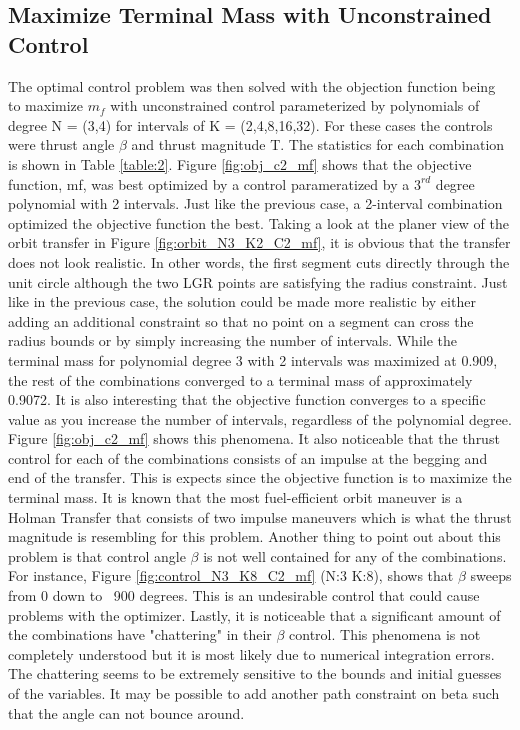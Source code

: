 \documentclass[]{article}
\begin{document}
	\subsection{Maximize Terminal Mass with Unconstrained Control}
	 The optimal control problem was then solved with the objection function being to maximize \(m_f\) with unconstrained control parameterized by polynomials of degree N = (3,4) for intervals of K = (2,4,8,16,32). For these cases the controls were thrust angle \(\beta\) and thrust magnitude T. The statistics for each combination is shown in Table \ref{table:2}. Figure \ref{fig:obj_c2_mf} shows that the objective function, mf, was best optimized by a control parameratized by a \(3^{rd}\) degree polynomial with 2 intervals. Just like the previous case, a 2-interval combination optimized the objective function the best. Taking a look at the planer view of the orbit transfer in Figure \ref{fig:orbit_N3_K2_C2_mf}, it is obvious that the transfer does not look realistic. In other words, the first segment cuts directly through the unit circle although the two LGR points are satisfying the radius constraint. Just like in the previous case, the solution could be made more realistic by either adding an additional constraint so that no point on a segment can cross the radius bounds or by simply increasing the number of intervals. While the terminal mass for polynomial degree 3 with 2 intervals was maximized at 0.909, the rest of the combinations converged to a terminal mass of approximately 0.9072. It is also interesting that the objective function converges to a specific value as you increase the number of intervals, regardless of the polynomial degree. Figure \ref{fig:obj_c2_mf} shows this phenomena. It also noticeable that the thrust control for each of the combinations consists of an impulse at the begging and end of the transfer. This is expects since the objective function is to maximize the terminal mass. It is known that the most fuel-efficient orbit maneuver is a Holman Transfer that consists of two impulse maneuvers which is what the thrust magnitude is resembling for this problem. Another thing to point out about this problem is that control angle \(\beta\) is not well contained for any of the combinations. For instance, Figure \ref{fig:control_N3_K8_C2_mf} (N:3 K:8), shows that \(\beta\) sweeps from 0 down to ~900 degrees. This is an undesirable control that could cause problems with the optimizer. Lastly, it is noticeable that a significant amount of the combinations have "chattering" in their \(\beta\) control. This phenomena is not completely understood but it is most likely due to numerical integration errors. The chattering seems to be extremely sensitive to the bounds and initial guesses of the variables. It may be possible to add another path constraint on beta such that the angle can not bounce around.
\end{document}
